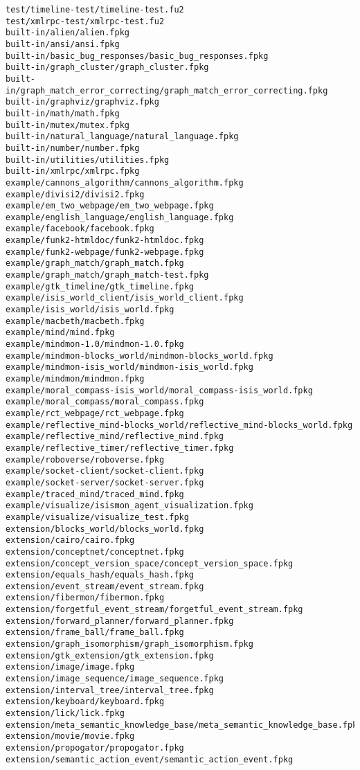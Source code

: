 \begin{lstlisting}
test/timeline-test/timeline-test.fu2
test/xmlrpc-test/xmlrpc-test.fu2
built-in/alien/alien.fpkg
built-in/ansi/ansi.fpkg
built-in/basic_bug_responses/basic_bug_responses.fpkg
built-in/graph_cluster/graph_cluster.fpkg
built-in/graph_match_error_correcting/graph_match_error_correcting.fpkg
built-in/graphviz/graphviz.fpkg
built-in/math/math.fpkg
built-in/mutex/mutex.fpkg
built-in/natural_language/natural_language.fpkg
built-in/number/number.fpkg
built-in/utilities/utilities.fpkg
built-in/xmlrpc/xmlrpc.fpkg
example/cannons_algorithm/cannons_algorithm.fpkg
example/divisi2/divisi2.fpkg
example/em_two_webpage/em_two_webpage.fpkg
example/english_language/english_language.fpkg
example/facebook/facebook.fpkg
example/funk2-htmldoc/funk2-htmldoc.fpkg
example/funk2-webpage/funk2-webpage.fpkg
example/graph_match/graph_match.fpkg
example/graph_match/graph_match-test.fpkg
example/gtk_timeline/gtk_timeline.fpkg
example/isis_world_client/isis_world_client.fpkg
example/isis_world/isis_world.fpkg
example/macbeth/macbeth.fpkg
example/mind/mind.fpkg
example/mindmon-1.0/mindmon-1.0.fpkg
example/mindmon-blocks_world/mindmon-blocks_world.fpkg
example/mindmon-isis_world/mindmon-isis_world.fpkg
example/mindmon/mindmon.fpkg
example/moral_compass-isis_world/moral_compass-isis_world.fpkg
example/moral_compass/moral_compass.fpkg
example/rct_webpage/rct_webpage.fpkg
example/reflective_mind-blocks_world/reflective_mind-blocks_world.fpkg
example/reflective_mind/reflective_mind.fpkg
example/reflective_timer/reflective_timer.fpkg
example/roboverse/roboverse.fpkg
example/socket-client/socket-client.fpkg
example/socket-server/socket-server.fpkg
example/traced_mind/traced_mind.fpkg
example/visualize/isismon_agent_visualization.fpkg
example/visualize/visualize_test.fpkg
extension/blocks_world/blocks_world.fpkg
extension/cairo/cairo.fpkg
extension/conceptnet/conceptnet.fpkg
extension/concept_version_space/concept_version_space.fpkg
extension/equals_hash/equals_hash.fpkg
extension/event_stream/event_stream.fpkg
extension/fibermon/fibermon.fpkg
extension/forgetful_event_stream/forgetful_event_stream.fpkg
extension/forward_planner/forward_planner.fpkg
extension/frame_ball/frame_ball.fpkg
extension/graph_isomorphism/graph_isomorphism.fpkg
extension/gtk_extension/gtk_extension.fpkg
extension/image/image.fpkg
extension/image_sequence/image_sequence.fpkg
extension/interval_tree/interval_tree.fpkg
extension/keyboard/keyboard.fpkg
extension/lick/lick.fpkg
extension/meta_semantic_knowledge_base/meta_semantic_knowledge_base.fpkg
extension/movie/movie.fpkg
extension/propogator/propogator.fpkg
extension/semantic_action_event/semantic_action_event.fpkg

\end{lstlisting}
